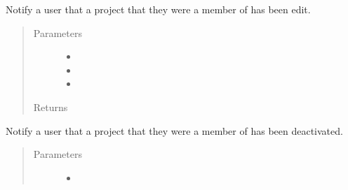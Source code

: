 \documentclass[letterpaper,10pt,english]{sphinxmanual}
\begin{document}
\begin{fulllineitems}
\begin{fulllineitems}
\label{\detokenize{apidoc/utdesign_procurement:utdesign_procurement.emailer.EmailHandler.notifyProjectEdit}}
Notify a user that a project that they were a member of has been edit.
\begin{quote}\begin{description}
\item[{Parameters}] \leavevmode\begin{itemize}
\item {} 
 \textendash{} 

\item {} 
 \textendash{} 

\item {} 
 \textendash{} 

\end{itemize}

\item[{Returns}] \leavevmode


\end{description}\end{quote}

\end{fulllineitems}


\begin{fulllineitems}
\label{\detokenize{apidoc/utdesign_procurement:utdesign_procurement.emailer.EmailHandler.notifyProjectInactivate}}
Notify a user that a project that they were a member of has been deactivated.
\begin{quote}\begin{description}
\item[{Parameters}] \leavevmode\begin{itemize}
\item {} 
 \textendash{} 


\end{itemize}
\end{description}
\end{quote}
\end{fulllineitems}
\end{fulllineitems}
\end{document}
